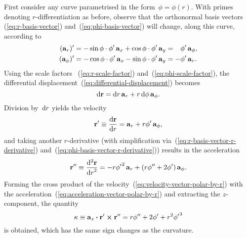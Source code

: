 First consider any curve parametrised in the form~$\phi = \phi (r)$.
With primes denoting $r$-differentiation as before,
observe that the orthonormal basis vectors~%
  (\ref{eq:r-basis-vector}) and~(\ref{eq:phi-basis-vector})
will change, along this curve, according to
\begin{align}
  (\basisvec{r})'
  &= -\sin\phi \cdot \phi' \basisvec{x} + \cos\phi \cdot \phi' \basisvec{y}
  = \+\phi' \basisvec{\phi},
    \label{eq:r-basis-vector-r-derivative} \\
  (\basisvec{\phi})'
  &= -\cos\phi \cdot \phi' \basisvec{x} - \sin\phi \cdot \phi' \basisvec{y}
  = -\phi' \basisvec{r}.
    \label{eq:phi-basis-vector-r-derivative}
\end{align}
Using the scale factors~%
  (\ref{eq:r-scale-factor}) and~(\ref{eq:phi-scale-factor}),
the differential displacement~(\ref{eq:differential-displacement})
becomes
\begin{equation}
  \mathop{}\!\mathrm{d}\boldsymbol{\mathrm{r}} = \mathop{}\!\mathrm{d} r \mathop{}\!\boldsymbol{\mathrm{a}}_{r} + r \mathop{}\!\mathrm{d}\phi \mathop{}\!\boldsymbol{\mathrm{a}}_{\phi}.
  \label{eq:differential-displacement-polar}
\end{equation}
Division by~$\mathop{}\!\mathrm{d} r$ yields the velocity
\begin{equation}
  \vec{r}' \defeq \tder{\vec{r}}{r} =
  \basisvec{r} + r \phi' \basisvec{\phi},
  \label{eq:velocity-vector-polar-by-r}
\end{equation}
and taking another $r$-derivative
(with simplification via~(\ref{eq:r-basis-vector-r-derivative})
and~(\ref{eq:phi-basis-vector-r-derivative}))
results in the acceleration
\begin{equation}
  \vec{r}'' \defeq \tder[2]{\vec{r}}{r} =
  -r {\phi'}^2 \basisvec{r}
    +
  \roundbr*{r \phi'' + 2 \phi'} \basisvec{\phi}.
  \label{eq:acceleration-vector-polar-by-r}
\end{equation}
Forming the cross product of
the velocity~(\ref{eq:velocity-vector-polar-by-r})
with the acceleration~(\ref{eq:acceleration-vector-polar-by-r})
and extracting the $z$-component,
the quantity
\begin{equation}
  \kappa \equiv
  \mathop{}\!\boldsymbol{\mathrm{a}}_{z} \boldsymbol{\cdot} \boldsymbol{\mathrm{r}}' \boldsymbol{\times} \boldsymbol{\mathrm{r}}'' =
  r \phi'' + 2 \phi' + r^2 {\phi'}^3
  \label{eq:kappa-polar-by-r}
\end{equation}
is obtained,
which has the same sign changes as the curvature.

